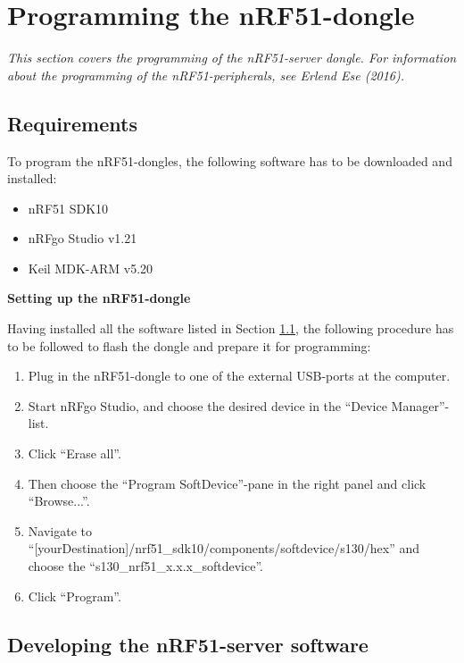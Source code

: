 \section{Programming the nRF51-dongle}
\textit{This section covers the programming of the nRF51-server dongle. For information about the programming of the nRF51-peripherals, see Erlend Ese (2016).}

\subsection{Requirements}
\label{sec:nrfrequirements}
To program the nRF51-dongles, the following software has to be downloaded and installed:
\begin{itemize}
	\item nRF51 SDK10\cite{nrf51sdk}
	\item nRFgo Studio v1.21\cite{nrfgo}
	\item Keil MDK-ARM v5.20\cite{keil}
\end{itemize}

\textbf{Setting up the nRF51-dongle}

Having installed all the software listed in Section \ref{sec:nrfrequirements}, the following procedure has to be followed to flash the dongle and prepare it for programming:
\begin{enumerate}
	\item Plug in the nRF51-dongle to one of the external USB-ports at the computer.
	\item Start nRFgo Studio, and choose the desired device in the ``Device Manager''-list.
	\item Click ``Erase all''.
	\item Then choose the ``Program SoftDevice''-pane in the right panel and click ``Browse...''.
	\item Navigate to ``[yourDestination]/nrf51\_sdk10/components/softdevice/s130/hex'' and choose the ``s130\_nrf51\_x.x.x\_softdevice''.
	\item Click ``Program''.
\end{enumerate}

\subsection{Developing the nRF51-server software}
